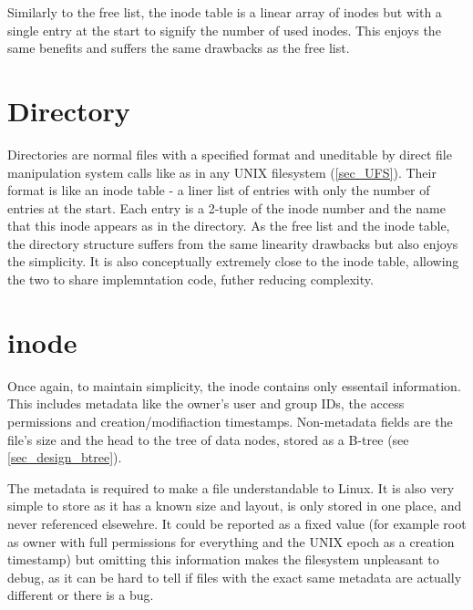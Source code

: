         Similarly to the free list, the inode table is a linear array of inodes
        but with a single entry at the start to signify the number of used
        inodes. This enjoys the same benefits and suffers the same drawbacks as
        the free list.

    \section{Directory}

        Directories are normal files with a specified format and uneditable by
        direct file manipulation system calls like  as in any
        UNIX filesystem (\ref{sec_UFS}). Their format is like an inode table -
        a liner list of entries with only the number of entries at the start.
        Each entry is a 2-tuple of the inode number and the name that this
        inode appears as in the directory. As the free list and the inode
        table, the directory structure suffers from the same linearity
        drawbacks but also enjoys the simplicity.  It is also conceptually
        extremely close to the inode table, allowing the two to share
        implemntation code, futher reducing complexity.

    \section{inode}

        Once again, to maintain simplicity, the inode contains only essentail
        information. This includes metadata like the owner's user and group
        IDs, the access permissions and creation/modifiaction timestamps.
        Non-metadata fields are the file's size and the head to the tree of
        data nodes, stored as a B-tree (see \ref{sec_design_btree}).

        The metadata is required to make a file understandable to Linux. It is
        also very simple to store as it has a known size and layout, is only
        stored in one place, and never referenced elsewehre. It could be
        reported as a fixed value (for example root as owner with full
        permissions for everything and the UNIX epoch as a creation timestamp)
        but omitting this information makes the filesystem unpleasant to debug,
        as it can be hard to tell if files with the exact same metadata are
        actually different or there is a bug.

